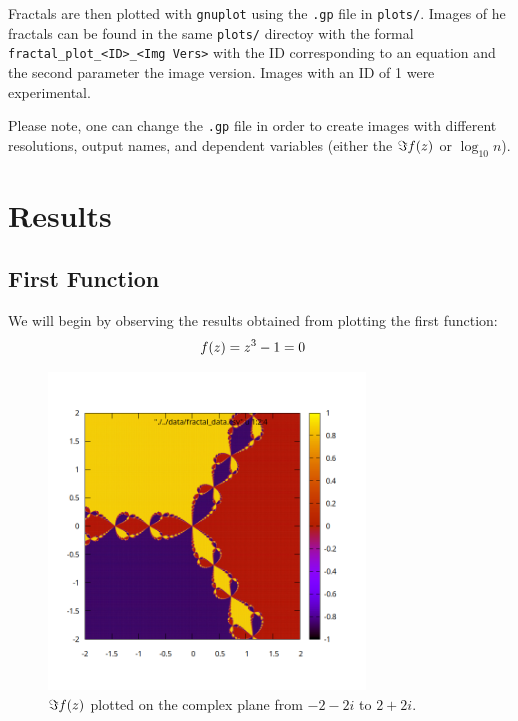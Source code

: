 \documentclass[12pt]{article}
\DeclarePairedDelimiter\rb{(}{)}
\begin{document}
Fractals are then plotted with \texttt{gnuplot} using the \texttt{.gp} file in \texttt{plots/}. Images of he fractals can be found in the same \texttt{plots/} directoy with the formal \texttt{fractal_plot_<ID>_<Img Vers>} with the ID corresponding to an equation and the second parameter the image version. Images with an ID of 1 were experimental.

Please note, one can change the \texttt{.gp} file in order to create images with different resolutions, output names, and dependent variables (either the \(\Im f\rb*{z}\) or \(\log_{10} n\)).

\section{Results}
\label{sec:results}

\subsection{First Function}
\label{subsec:first}



We will begin by observing the results obtained from plotting the first function:
\begin{align*}
	f\rb*{z} & =  z^{3} - 1 = 0 &\\
\end{align*}

     \begin{figure}[ht]
    \centering
    \includegraphics[width=0.75\textwidth]{./../problem04/plots/fractal_plot-02_01.png}
    \caption{\( \Im f\rb*{z}\) plotted on the complex plane from \(-2 -2i\) to \(2 + 2i\).}
    \label{fig:02_01}
\end{figure}
\end{document}
